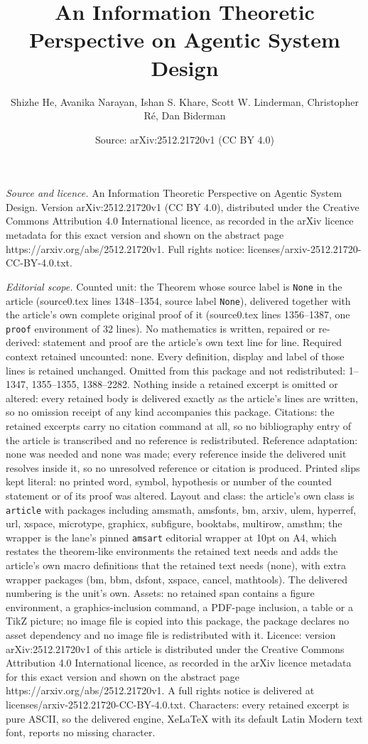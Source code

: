 \documentclass[10pt,a4paper]{amsart}
\title[An Information Theoretic Perspective on Agentic System Desig]{An Information Theoretic Perspective on Agentic System Design}
\author{Shizhe He, Avanika Narayan, Ishan S. Khare, Scott W. Linderman, Christopher R\'e, Dan Biderman}
\date{Source: arXiv:2512.21720v1 (CC BY 4.0)}
\begin{document}
\maketitle

\noindent\emph{Source and licence.} An Information Theoretic Perspective on Agentic System Design. Version arXiv:2512.21720v1 (CC BY 4.0), distributed under the Creative Commons Attribution 4.0 International licence, as recorded in the arXiv licence metadata for this exact version and shown on the abstract page https://arxiv.org/abs/2512.21720v1. Full rights notice: licenses/arxiv-2512.21720-CC-BY-4.0.txt.\par\smallskip

\noindent\textit{Editorial scope.} Counted unit: the Theorem whose source label is \texttt{None} in the article (source0.tex lines 1348--1354, source label \texttt{None}), delivered together with the article's own complete original proof of it (source0.tex lines 1356--1387, one \texttt{proof} environment of 32 lines). No mathematics is written, repaired or re-derived: statement and proof are the article's own text line for line. Required context retained uncounted: none. Every definition, display and label of those lines is retained unchanged. Omitted from this package and not redistributed: 1--1347, 1355--1355, 1388--2282. Nothing inside a retained excerpt is omitted or altered: every retained body is delivered exactly as the article's lines are written, so no omission receipt of any kind accompanies this package. Citations: the retained excerpts carry no citation command at all, so no bibliography entry of the article is transcribed and no reference is redistributed. Reference adaptation: none was needed and none was made; every reference inside the delivered unit resolves inside it, so no unresolved reference or citation is produced. Printed slips kept literal: no printed word, symbol, hypothesis or number of the counted statement or of its proof was altered. Layout and class: the article's own class is \texttt{article} with packages including amsmath, amsfonts, bm, arxiv, ulem, hyperref, url, xspace, microtype, graphicx, subfigure, booktabs, multirow, amsthm; the wrapper is the lane's pinned \texttt{amsart} editorial wrapper at 10pt on A4, which restates the theorem-like environments the retained text needs and adds the article's own macro definitions that the retained text needs (none), with extra wrapper packages (bm, bbm, dsfont, xspace, cancel, mathtools). The delivered numbering is the unit's own. Assets: no retained span contains a figure environment, a graphics-inclusion command, a PDF-page inclusion, a table or a TikZ picture; no image file is copied into this package, the package declares no asset dependency and no image file is redistributed with it. Licence: version arXiv:2512.21720v1 of this article is distributed under the Creative Commons Attribution 4.0 International licence, as recorded in the arXiv licence metadata for this exact version and shown on the abstract page https://arxiv.org/abs/2512.21720v1. A full rights notice is delivered at licenses/arxiv-2512.21720-CC-BY-4.0.txt. Characters: every retained excerpt is pure ASCII, so the delivered engine, XeLaTeX with its default Latin Modern text font, reports no missing character.
\end{document}

